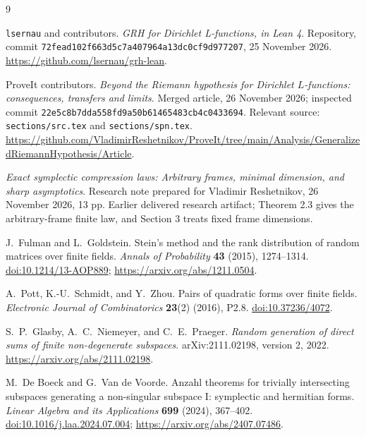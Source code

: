 \documentclass[11pt]{article}
\theoremstyle{definition}\newtheorem{definition}[theorem]{Definition}
\theoremstyle{remark}\newtheorem{remark}[theorem]{Remark}
\newcommand{\1}{\mathbf 1}
\begin{document}
\begin{thebibliography}{9}
\raggedright
{}
\texttt{lsernau} and contributors.
\emph{GRH for Dirichlet L-functions, in Lean 4}.
Repository, commit \texttt{72fead102f663d5c7a407964a13dc0cf9d977207},
25 November 2026.\newline
\url{https://github.com/lsernau/grh-lean}.

ProveIt contributors.
\emph{Beyond the Riemann hypothesis for Dirichlet $L$-functions:
consequences, transfers and limits}.
Merged article, 26 November 2026; inspected commit
\texttt{22e5c8b7dda558fd9a50b61465483cb4c0433694}.
Relevant source: \texttt{sections/src.tex} and \texttt{sections/spn.tex}.\newline
\url{https://github.com/VladimirReshetnikov/ProveIt/tree/main/Analysis/GeneralizedRiemannHypothesis/Article}.

\emph{Exact symplectic compression laws: Arbitrary frames, minimal
dimension, and sharp asymptotics}. Research note prepared for Vladimir
Reshetnikov, 26 November 2026, 13 pp. Earlier delivered research artifact;
Theorem 2.3 gives the arbitrary-frame finite law, and Section 3 treats
fixed frame dimensions.

J.~Fulman and L.~Goldstein.
Stein's method and the rank distribution of random matrices over finite fields.
\emph{Annals of Probability} \textbf{43} (2015), 1274--1314.\newline
\href{https://doi.org/10.1214/13-AOP889}{doi:10.1214/13-AOP889};
\url{https://arxiv.org/abs/1211.0504}.

A.~Pott, K.-U.~Schmidt, and Y.~Zhou.
Pairs of quadratic forms over finite fields.
\emph{Electronic Journal of Combinatorics} \textbf{23}(2) (2016), P2.8.\newline
\href{https://doi.org/10.37236/4072}{doi:10.37236/4072}.

S.~P.~Glasby, A.~C.~Niemeyer, and C.~E.~Praeger.
\emph{Random generation of direct sums of finite non-degenerate subspaces}.
arXiv:2111.02198, version 2, 2022.\newline
\url{https://arxiv.org/abs/2111.02198}.

M.~De Boeck and G.~Van de Voorde.
Anzahl theorems for trivially intersecting subspaces generating a non-singular
subspace I: symplectic and hermitian forms.
\emph{Linear Algebra and its Applications} \textbf{699} (2024), 367--402.\newline
\href{https://doi.org/10.1016/j.laa.2024.07.004}{doi:10.1016/j.laa.2024.07.004};
\url{https://arxiv.org/abs/2407.07486}.
\end{thebibliography}
\end{document}
